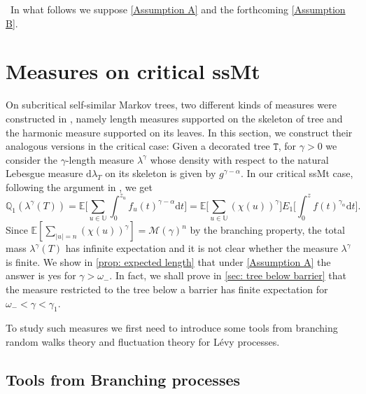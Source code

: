 \documentclass[12pt]{article}
\numberwithin{equation}{section}
\theoremstyle{plain}
\theoremstyle{definition}
\newcommand{\D}{\mathrm{d}}
\begin{document}




\begin{center} \hrulefill \ In what follows we suppose \cref{Assumption A} and the forthcoming \cref{Assumption B}. \hrulefill  \end{center}

\section{Measures on critical ssMt}\label{sec: length measure}



On subcritical self-similar Markov trees, two different kinds of measures were constructed in \cite{BertoinJean2024SMta}, namely length measures supported on the skeleton of tree and the harmonic measure supported on its leaves. In this section, we construct their analogous versions in the critical case: Given a decorated tree $\mathtt{T}$, for $\gamma >0$ we consider the $\gamma$-length measure $\lambda^\gamma$ whose density with respect to the natural Lebesgue measure $\mathrm{d}\lambda_T$ on its skeleton is given by $g^{\gamma-\alpha}$. In our critical ssMt case, following the argument in \cite[Section 2.3.1]{BertoinJean2024SMta}, we get
\[
\mathbb{Q}_1( \lambda^\gamma(T)) =
\mathbb{E}\bigg[\sum_{u\in\mathbb{U}}\int^{z_u}_0 f_u(t)^{\gamma-\alpha}\D t\bigg] = \mathbb{E}\bigg[\sum_{u\in\mathbb{U}}(\chi(u))^{\gamma}\bigg]E_1\bigg[\int^{z}_0 f(t)^{\gamma_\alpha}\D t \bigg].
\]
Since $\mathbb{E}[\sum_{|u|=n}(\chi(u))^{\gamma}] = \mathcal{M}(\gamma)^n$ by the branching property, the total mass  $\lambda^\gamma(T)$  has infinite expectation and it is not clear whether the measure $\lambda^{\gamma}$ is finite. We show in \cref{prop: expected length} that under \cref{Assumption A} the answer is yes for $\gamma>\omega_-$. In fact,  we shall prove in \cref{sec: tree below barrier} that the measure restricted to the tree below a barrier has finite expectation for $\omega_-<\gamma< \gamma_1$.

To study such measures we first need to introduce some tools from  branching random walks theory and fluctuation theory for L\'evy processes.

\subsection{Tools from Branching processes}\label{sec: tools from branching processes}
\end{document}
